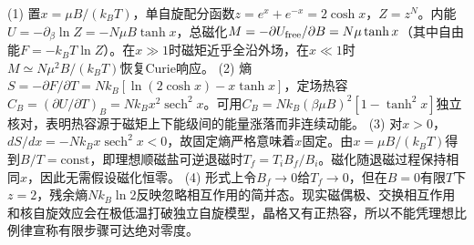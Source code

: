 (1) 置\(x=\mu B/(k_BT)\)，单自旋配分函数\(z=e^x+e^{-x}=2\cosh x\)，\(Z=z^N\)。内能\(U=-\partial_\beta\ln Z=-N\mu B\tanh x\)，总磁化\(M=-\partial U_{\rm free}/\partial B=N\mu\tanh x\)（其中自由能\(F=-k_BT\ln Z\)）。在\(x\gg1\)时磁矩近乎全沿外场，在\(x\ll1\)时\(M\simeq N\mu^2B/(k_BT)\)恢复Curie响应。
(2) 熵\(S=-\partial F/\partial T=Nk_B[\ln(2\cosh x)-x\tanh x]\)，定场热容\(C_B=(\partial U/\partial T)_B=Nk_Bx^2\operatorname{sech}^2x\)。可用\(C_B=Nk_B(\beta\mu B)^2[1-\tanh^2x]\)独立核对，表明热容源于磁矩上下能级间的能量涨落而非连续动能。
(3) 对\(x>0\)，\(dS/dx=-Nk_Bx\operatorname{sech}^2x<0\)，故固定熵严格意味着\(x\)固定。由\(x=\mu B/(k_BT)\)得到\(B/T=\mathrm{const}\)，即理想顺磁盐可逆退磁时\(T_f=T_iB_f/B_i\)。磁化随退磁过程保持相同\(x\)，因此无需假设磁化恒零。
(4) 形式上令\(B_f\to0\)给\(T_f\to0\)，但在\(B=0\)有限\(T\)下\(z=2\)，残余熵\(Nk_B\ln2\)反映忽略相互作用的简并态。现实磁偶极、交换相互作用和核自旋效应会在极低温打破独立自旋模型，晶格又有正热容，所以不能凭理想比例律宣称有限步骤可达绝对零度。

